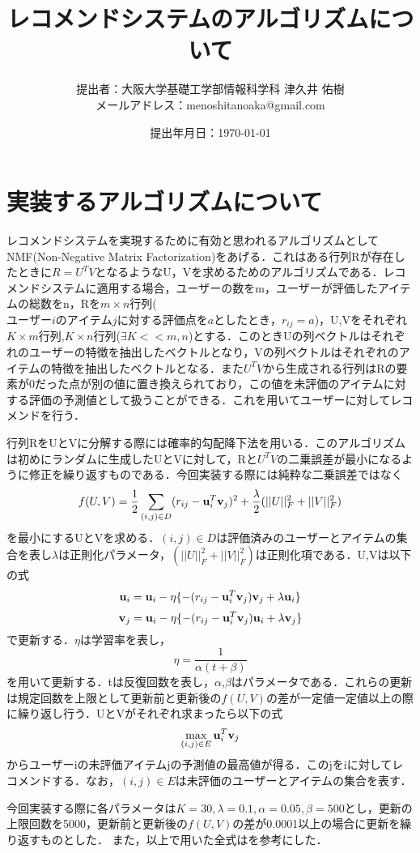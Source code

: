 \documentclass[a4j,titlepage]{jarticle}
\title{レコメンドシステムのアルゴリズムについて}
\author{提出者：大阪大学基礎工学部情報科学科 津久井 佑樹 \\ メールアドレス：menoshitanoaka@gmail.com}
\date{提出年月日：\today}
\begin{document}
\maketitle


\section{実装するアルゴリズムについて}
レコメンドシステムを実現するために有効と思われるアルゴリズムとしてNMF(Non-Negative Matrix Factorization)をあげる．これはある行列Rが存在したときに$R=U^TV$となるようなU，Vを求めるためのアルゴリズムである．レコメンドシステムに適用する場合，ユーザーの数をm，ユーザーが評価したアイテムの総数をn，Rを$m \times n$行列($ユーザーiのアイテムjに対する評価点をaとしたとき，r_{ij}=a$)，U,Vをそれぞれ$K \times m$行列,$K \times n$行列($\exists K << m,n$)とする．このときUの列ベクトルはそれぞれのユーザーの特徴を抽出したベクトルとなり，Vの列ベクトルはそれぞれのアイテムの特徴を抽出したベクトルとなる．また$U^TV$から生成される行列はRの要素が0だった点が別の値に置き換えられており，この値を未評価のアイテムに対する評価の予測値として扱うことができる．これを用いてユーザーに対してレコメンドを行う．

行列RをUとVに分解する際には確率的勾配降下法を用いる．このアルゴリズムは初めにランダムに生成したUとVに対して，Rと$U^TV$の二乗誤差が最小になるように修正を繰り返すものである．今回実装する際には純粋な二乗誤差ではなく
\[f(U,V)=\frac{1}{2}\sum_{(i,j) \in D} (r_{ij}-{\bf u}_{i}^T{\bf v}_{j})^2 + \frac{\lambda}{2}(||U||_{F}^2+||V||_{F}^2)\]
を最小にするUとVを求める．$(i,j) \in D$は評価済みのユーザーとアイテムの集合を表し$\lambda$は正則化パラメータ，$(||U||_{F}^2+||V||_{F}^2)$は正則化項である．U,Vは以下の式
\[{\bf u}_{i} = {\bf u}_{i} - \eta\{-(r_{ij}-{\bf u}_{i}^T{\bf v}_{j}){\bf v}_{j} + \lambda {\bf u}_{i}\}\]
\[{\bf v}_{j} = {\bf u}_{i} - \eta\{-(r_{ij}-{\bf u}_{i}^T{\bf v}_{j}){\bf u}_{i} + \lambda {\bf v}_{j}\}\]
で更新する．$\eta$は学習率を表し，
\[\eta = \frac{1}{\alpha(t+\beta)}\]
を用いて更新する．tは反復回数を表し，$\alpha$,$\beta$はパラメータである．これらの更新は規定回数を上限として更新前と更新後の$f(U,V)$の差が一定値一定値以上の際に繰り返し行う．UとVがそれぞれ求まったら以下の式\[\max_{(i,j)\in E}{\bf u}_{i}^T{\bf v}_{j}\]
からユーザーiの未評価アイテムjの予測値の最高値が得る．このjをiに対してレコメンドする．なお，$(i,j) \in E$は未評価のユーザーとアイテムの集合を表す．

今回実装する際に各パラメータは$K=30, \lambda=0.1, \alpha=0.05, \beta=500$とし，更新の上限回数を5000，更新前と更新後の$f(U,V)$の差が0.0001以上の場合に更新を繰り返すものとした．
また，以上で用いた全式は\cite{kamishima}を参考にした．
\end{document}
